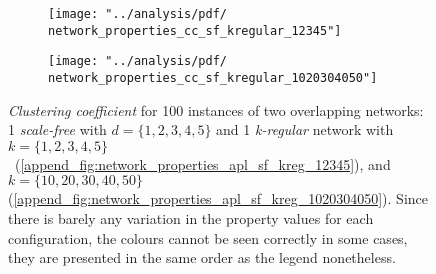 \begin{figure}[H]
\centering
\begin{subfigure}{.49\linewidth}
  \centering
 \texttt{[image: "../analysis/pdf/ network\_properties\_cc\_sf\_kregular\_12345"]}
 \caption{}
 \label{append_fig:network_properties_cc_sf_kreg_12345}
\end{subfigure}%
\begin{subfigure}{.49\linewidth}
  \centering
 \texttt{[image: "../analysis/pdf/ network\_properties\_cc\_sf\_kregular\_1020304050"]}
 \caption{}
 \label{append_fig:network_properties_cc_sf_kreg_1020304050}
\end{subfigure}

\begin{minipage}{0.9\linewidth}
\vspace{0.2cm}
\caption{\textit{Clustering coefficient} for 100 instances of two overlapping networks: 1 \textit{scale-free} with $d=\{1,2,3,4,5\}$ and 1 \textit{k-regular} network with ~$k=\{1,2,3,4,5\}$~(\ref{append_fig:network_properties_apl_sf_kreg_12345}), and  $k=\{10,20,30,40,50\}$ (\ref{append_fig:network_properties_apl_sf_kreg_1020304050}). Since there is barely any variation in the property values for each configuration, the colours cannot be seen correctly in some cases, they are presented in the same order as the legend nonetheless.}
\label{append_fig:network_properties_cc_sf_kreg}
\end{minipage}

\end{figure}
\clearpage


\renewcommand\thefigure{\thesection.\arabic{figure}}    
\setcounter{figure}{0}   

\renewcommand\thetable{\thesection.\arabic{table}}    
\setcounter{table}{0}     


